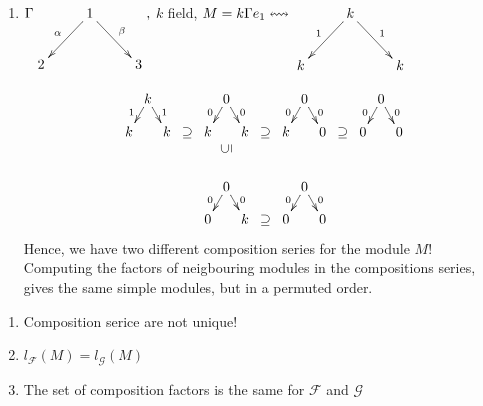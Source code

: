 \begin{exam}
\begin{enumerate}[(1)]
\item $\G \xymatrix{ & 1\ar[dr]^{\beta} \ar[dl]_{\alpha} & \\ 2 & & 3
  },$ $k$ field, $M = k\G e_1 \leftrightsquigarrow \xymatrix{ & k\ar[dr]^{1} \ar[dl]_{1} & \\ k & & k }\\$

\[\xymatrix@C=2pt@R=10pt{
& k\ar[dr]^{1} \ar[dl]_{1} & & & & 0\ar[dr]^{0} \ar[dl]_{0} & & & & 0\ar[dr]^{0} \ar[dl]_{0} & & & & 0\ar[dr]^{0} \ar[dl]_{0} &\\
k & & k & \supseteq & k & & k & \supseteq & k & & 0 & \supseteq & 0 & & 0\\
& & & & & \ar@{}[u]|-*[@]{\subseteq} & & & & & & & & & \\
& & & & & 0\ar[dr]^{0} \ar[dl]_{0} & & & & 0\ar[dr]^{0} \ar[dl]_{0} & & & & & \\
& & & & 0 & & k & \supseteq & 0 & & 0 &  &  & & 
}\]
 Hence, we have two different composition series for the module $M$!
Computing the factors of neigbouring modules in the compositions
series, gives the same simple modules, but in a permuted order. 
\end{enumerate}
\end{exam}

\begin{note}
	\begin{enumerate}[(1)]
		\item Composition serice are not unique!
		\item $l_{\mathscr{F}}(M) = l_{\mathscr{G}}(M)$
		\item The set of composition factors is the same for $\mathscr{F}$ and $\mathscr{G}$
	\end{enumerate}
\end{note}

